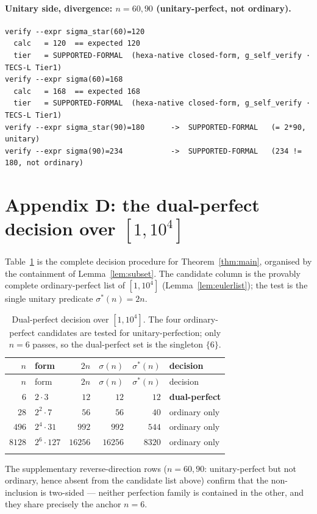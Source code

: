 \documentclass[11pt,a4paper]{article}
\newcommand{\sig}{\sigma}
\newcommand{\sigs}{\sigma^{*}}
\theoremstyle{plain}
\theoremstyle{definition}
\begin{document}
\paragraph{Unitary side, divergence: $n=60,90$ (unitary-perfect, not ordinary).}
\begin{verbatim}
verify --expr sigma_star(60)=120
  calc   = 120  == expected 120
  tier   = SUPPORTED-FORMAL  (hexa-native closed-form, g_self_verify · TECS-L Tier1)
verify --expr sigma(60)=168
  calc   = 168  == expected 168
  tier   = SUPPORTED-FORMAL  (hexa-native closed-form, g_self_verify · TECS-L Tier1)
verify --expr sigma_star(90)=180      ->  SUPPORTED-FORMAL   (= 2*90, unitary)
verify --expr sigma(90)=234           ->  SUPPORTED-FORMAL   (234 != 180, not ordinary)
\end{verbatim}

\section{Appendix D: the dual-perfect decision over $[1,10^4]$}
\label{sec:decision}

Table~\ref{tab:decision} is the complete decision procedure for
Theorem~\ref{thm:main}, organised by the containment of
Lemma~\ref{lem:subset}. The candidate column is the provably complete
ordinary-perfect list of $[1,10^4]$ (Lemma~\ref{lem:eulerlist}); the test is the
single unitary predicate $\sigs(n)=2n$.

\begin{longtable}{r l r r r l}
\caption{Dual-perfect decision over $[1,10^4]$. The four ordinary-perfect
candidates are tested for unitary-perfection; only $n=6$ passes, so the
dual-perfect set is the singleton $\{6\}$.}\\
\toprule
$n$ & form & $2n$ & $\sig(n)$ & $\sigs(n)$ & decision\\
\midrule
\endfirsthead
\toprule
$n$ & form & $2n$ & $\sig(n)$ & $\sigs(n)$ & decision\\
\midrule
\endhead
$6$    & $2\cdot3$     & $12$    & $12$    & $12$   & \textbf{dual-perfect}\\
$28$   & $2^2\cdot7$   & $56$    & $56$    & $40$   & ordinary only\\
$496$  & $2^4\cdot31$  & $992$   & $992$   & $544$  & ordinary only\\
$8128$ & $2^6\cdot127$ & $16256$ & $16256$ & $8320$ & ordinary only\\
\bottomrule
\label{tab:decision}
\end{longtable}

\noindent The supplementary reverse-direction rows ($n=60,90$: unitary-perfect
but not ordinary, hence absent from the candidate list above) confirm that the
non-inclusion is two-sided --- neither perfection family is contained in the
other, and they share precisely the anchor $n=6$.



\end{document}
